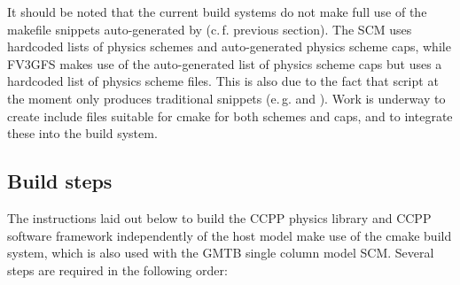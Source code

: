 It should be noted that the current build systems do not make full use of the makefile snippets auto-generated by  (c.\,f. previous section). The SCM uses hardcoded lists of physics schemes and auto-generated physics scheme caps, while FV3GFS makes use of the auto-generated list of physics scheme caps but uses a hardcoded list of physics scheme files. This is also due to the fact that script  at the moment only produces traditional  snippets (e.\,g.  and ). Work is underway to create include files suitable for cmake for both schemes and caps, and to integrate these into the build system.
\subsection{Build steps}\label{sec_ccpp_build_steps}
The instructions laid out below to build the CCPP physics library and CCPP software framework independently of the host model make use of the cmake build system, which is also used with the GMTB single column model SCM. Several steps are required in the following order:

